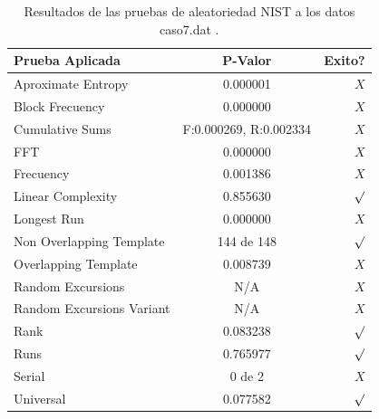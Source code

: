 \documentclass[10pt]{IEEEtran}
\begin{document}
\begin{table}[H]
\caption{Resultados de las pruebas de aleatoriedad NIST a los datos caso7.dat .}
\label{caso7}
\begin{center}
\begin{small}
\begin{tabular}{|l|c|r|}
\hline

Prueba Aplicada &  P-Valor & Exito? \\
\hline

Aproximate Entropy    &     0.000001 & $X$ \\

Block Frecuency  & 0.000000  &  $X$  \\

Cumulative Sums    &   F:0.000269, R:0.002334   & $X$ \\

FFT    &   0.000000 &   $X$      \\

Frecuency     & 0.001386 &  $X$   \\

Linear Complexity      &  0.855630  & $\surd$ \\

Longest Run      &   0.000000 &   $X$     \\

Non Overlapping Template      & 144 de 148    &    $\surd$          \\

Overlapping Template      &    0.008739   &       $X$        \\

Random Excursions      & N/A  &    $X$      \\

Random Excursions Variant & N/A &     $X$    \\

Rank & 0.083238  &      $\surd$      \\

Runs &     0.765977 &       $\surd$        \\

Serial &     0 de 2    &     $X$        \\

Universal &        0.077582 &   $\surd$            \\

\hline

\end{tabular}
\end{small}
\end{center}
\end{table}
\end{document}
